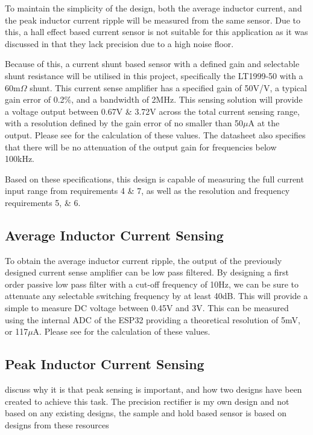 To maintain the simplicity of the design, both the average inductor current, and the peak inductor current ripple will be measured from the same sensor. Due to this, a hall effect based current sensor is not suitable for this application as it was discussed in  that they lack precision due to a high noise floor. 

Because of this, a current shunt based sensor with a defined gain and selectable shunt resistance will be utilised in this project, specifically the LT1999-50 with a 60m$\Omega$ shunt. This current sense amplifier has a specified gain of 50V/V, a typical gain error of 0.2\%, and a bandwidth of 2MHz. This sensing solution will provide a voltage output between 0.67V \& 3.72V across the total current sensing range, with a resolution defined by the gain error of no smaller than 50$\mu$A at the output. Please see  for the calculation of these values. The datasheet also specifies that there will be no attenuation of the output gain for frequencies below 100kHz. 

Based on these specifications, this design is capable of measuring the full current input range from requirements 4 \& 7, as well as the resolution and frequency requirements 5, \& 6.


\subsection{Average Inductor Current Sensing}

To obtain the average inductor current ripple, the output of the previously designed current sense amplifier can be low pass filtered. By designing a first order passive low pass filter with a cut-off frequency of 10Hz, we can be sure to attenuate any selectable switching frequency by at least 40dB. This will provide a simple to measure DC voltage between 0.45V and 3V. This can be measured using the internal ADC of the ESP32 providing a theoretical resolution of 5mV, or 117$\mu$A. Please see  for the calculation of these values.



\subsection{Peak Inductor Current Sensing}

discuss why it is that peak sensing is important, and how two designs have been created to achieve this task. The precision rectifier is my own design and not based on any existing designs, the sample and hold based sensor is based on designs from these resources \cite{peak_detector_designs, LTC6244_peak_detector}


